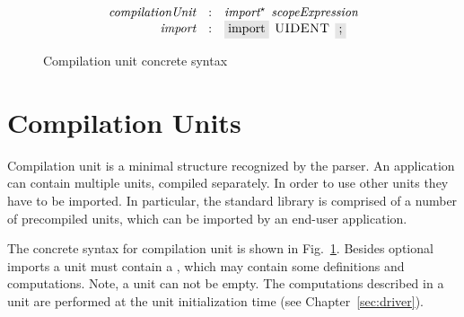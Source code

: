 \FloatBarrier

\begin{figure}[t]
  \[
    \begin{array}{rcl}
      \defterm{compilationUnit}  & : & \nonterm{import}^\star\s\nonterm{scopeExpression}\\
      \defterm{import}           & : & \term{import}\s\token{UIDENT}\s\term{;}
    \end{array}
  \]
  \caption{Compilation unit concrete syntax}
  \label{compilation_unit}
\end{figure}

\section{Compilation Units}
\label{sec:compilation_units}

Compilation unit is a minimal structure recognized by the parser. An application can contain multiple units, compiled separately.
In order to use other units they have to be imported. In particular, the standard library is comprised of a number of precompiled units,
which can be imported by an end-user application.

The concrete syntax for compilation unit is shown in Fig.~\ref{compilation_unit}. Besides optional imports a unit must contain
a , which may contain some definitions and computations. Note, a unit can not be empty. The computations described in
a unit are performed at the unit initialization time (see Chapter~\ref{sec:driver}).

